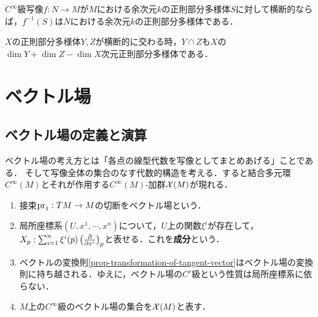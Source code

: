 \documentclass[uplatex,dvipdfmx]{jsreport}
\begin{document}
\begin{theorem}
    $C^\infty$級写像$f:N\to M$が$M$における余次元$k$の正則部分多様体$S$に対して横断的ならば，$f^{-1}(S)$は$N$における余次元$k$の正則部分多様体である．
\end{theorem}

\begin{theorem}
    $X$の正則部分多様体$Y,Z$が横断的に交わる時，$Y\cap Z$も$X$の$\dim Y+\dim Z-\dim X$次元正則部分多様体である．
\end{theorem}

\section{ベクトル場}

\subsection{ベクトル場の定義と演算}

\begin{tcolorbox}[colframe=ForestGreen, colback=ForestGreen!10!white,breakable,colbacktitle=ForestGreen!40!white,coltitle=black,fonttitle=\bfseries\sffamily,
title=]
    ベクトル場の考え方とは「各点の線型代数を写像としてまとめあげる」ことである．
    そして写像全体の集合のなす代数的構造を考える．すると結合多元環$C^\infty(M)$とそれが作用する$C^\infty(M)$-加群$\mathcal{X}(M)$が現れる．
\end{tcolorbox}

\begin{definition}\mbox{}
    \begin{enumerate}
        \item 接束$\mathrm{pr}_1:TM\to M$の切断をベクトル場という．
        \item 局所座標系$(U,x^1,\cdots,x^n)$について，$U$上の関数$\xi^i$が存在して，$X_p:\sum_{i=1}^n\xi^i(p)\left(\frac{\partial }{\partial x^i}\right)_p$と表せる．これを\textbf{成分}という．
        \item ベクトルの変換則\ref{prop-transformation-of-tangent-vector}はベクトル場の変換則に持ち越される．ゆえに，ベクトル場の$C^r$級という性質は局所座標系に依らない．
        \item $M$上の$C^\infty$級のベクトル場の集合を$\mathcal{X}(M)$と表す．
    \end{enumerate}
\end{definition}
\end{document}
